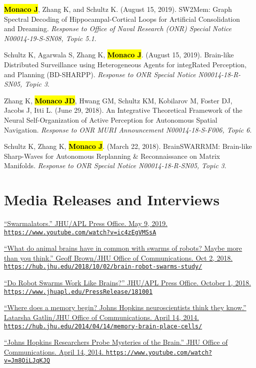 \documentclass[10pt]{article}
\newcommand{\itemtitle}[1]{{\color{hopkinsblue}\ul{#1}}}
\newcommand{\unpubtitle}[1]{{\color{hopkinsblue} #1}}
\newcommand{\joehl}[1]{\hl{\textbf{#1}}}
\newcommand{\aurl}[1]{{\color{dimgray}\texttt{#1}}}
\begin{document}
\begin{description}
  \item \joehl{Monaco J}, Zhang K, and Schultz K. (August 15, 2019).
    \unpubtitle{SW2Mem: Graph Spectral Decoding of Hippocampal-Cortical Loops for
      Artificial Consolidation and Dreaming}. \emph{Response to Office of Naval
    Research (ONR) Special Notice N00014-19-S-SN08, Topic 5.1}.
  \item Schultz K, Agarwala S, Zhang K, \joehl{Monaco J}. (August 15, 2019).
    \unpubtitle{Brain-like Distributed Surveillance using Heterogeneous Agents for
      integRated Perception, and Planning (BD-SHARPP)}. \emph{Response to ONR Special
    Notice N00014-18-R-SN05, Topic 3}.
  \item Zhang K, \joehl{Monaco JD}, Hwang GM, Schultz KM, Kobilarov M, Foster
    DJ, Jacobs J, Itti L. (June 29, 2018). \unpubtitle{An Integrative Theoretical
      Framework of the Neural Self-Organization of Active Perception for Autonomous
      Spatial Navigation}. \emph{Response to ONR MURI Announcement N00014-18-S-F006,
    Topic 6}.
  \item Schultz K, Zhang K, \joehl{Monaco J}. (March 22, 2018).
    \unpubtitle{BrainSWARRMM: Brain-like Sharp-Waves for Autonomous Replanning
      \& Reconnaissance on Matrix Manifolds}. \emph{Response to ONR Special Notice
    N00014-18-R-SN05, Topic 3}.
\end{description}

\section*{Media Releases and Interviews}

\begin{description}
  \item \href{https://www.youtube.com/watch?v=ic4zEgVMSsA}
    {``\itemtitle{Swarmalators}.'' JHU/APL Press Office. May 9, 2019.
    \aurl{https://www.youtube.com/watch?v=ic4zEgVMSsA}}
  \item \href{https://hub.jhu.edu/2018/10/02/brain-robot-swarms-study/}
    {``\itemtitle{What do animal brains have in common with swarms of robots?
      Maybe more than you think}.'' Geoff Brown/JHU Office of Communications. Oct 2,
    2018. \aurl{https://hub.jhu.edu/2018/10/02/brain-robot-swarms-study/}}
  \item \href{https://www.jhuapl.edu/PressRelease/181001}
    {``\itemtitle{Do Robot Swarms Work Like Brains?}'' JHU/APL Press Office. October 1, 2018.
    \aurl{https://www.jhuapl.edu/PressRelease/181001}}
  \item \href{https://hub.jhu.edu/2014/04/14/memory-brain-place-cells/}
    {``\itemtitle{Where does a memory begin? Johns Hopkins neuroscientists think they
      know}.'' Latarsha Gatlin/JHU Office of Communications. April 14, 2014.
    \aurl{https://hub.jhu.edu/2014/04/14/memory-brain-place-cells/}}
  \item \href{https://www.youtube.com/watch?v=Jm8OiLJqKJQ}
    {``\itemtitle{Johns Hopkins Researchers Probe Mysteries of
      the Brain}.'' JHU Office of Communications. April 14, 2014.
    \aurl{https://www.youtube.com/watch?v=Jm8OiLJqKJQ}}
\end{description}
\end{document}

